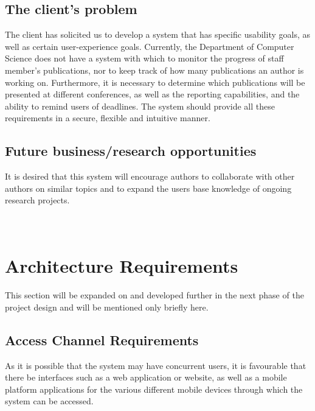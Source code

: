 \documentclass[a4paper]{article}
\begin{document}
	\subsection{The client's problem}
	The client has solicited us to develop a system that has specific usability goals, as well as certain user-experience goals. Currently, the Department of Computer Science does not have a system with which to monitor the progress of staff member's publications, nor to keep track of how many publications an author is working on. Furthermore, it is necessary to determine which publications will be presented at different conferences, as well as the reporting capabilities, and the ability to remind users of deadlines. The system should provide all these requirements in a secure, flexible and intuitive manner.
	
	\subsection{Future business/research opportunities}
	It is desired that this system will encourage authors to collaborate with other authors on similar topics and to expand the users base knowledge of ongoing research projects.
	\\
	\\
	\\
	
	
	\section{Architecture Requirements}
	This section will be expanded on and developed further in the next phase of the project design and will be mentioned only briefly here.
	\\
	\subsection{Access Channel Requirements}
	As it is possible that the system may have concurrent users, it is favourable that there be interfaces such as a web application or website, as well as a mobile platform applications for the various different mobile devices through which the system can be accessed.
	\\
\end{document}
